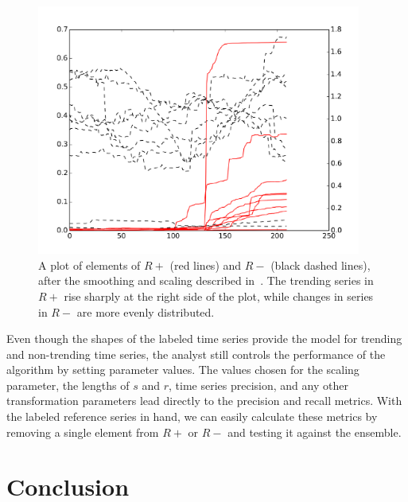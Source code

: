 \documentclass{article}
\begin{document}
\begin{figure}
\begin{center}
\includegraphics[width=0.95\textwidth]{fig/nikolov3.pdf} 
\caption{A plot of elements of $R+$ (red lines) and $R-$ (black dashed lines), 
after the smoothing and scaling described in~\cite{Nikolov:2011}.  
The trending series in $R+$ rise sharply at the right side of the plot, 
while changes in series in $R-$ are more evenly distributed.}
\label{fig:reference_series}
\end{center}
\end{figure}

Even though the shapes of the labeled time series provide the model for
trending and non-trending time series, the analyst still controls the performance
of the algorithm by setting parameter values.
The values chosen for the scaling parameter, the lengths of $s$ and $r$, time series
precision, and any other transformation parameters lead directly to the
precision and recall metrics. With the labeled reference series
in hand, we can easily calculate these metrics by removing a single
element from $R+$ or $R-$ and testing it against the ensemble. 


\section{Conclusion} 
\end{document}
